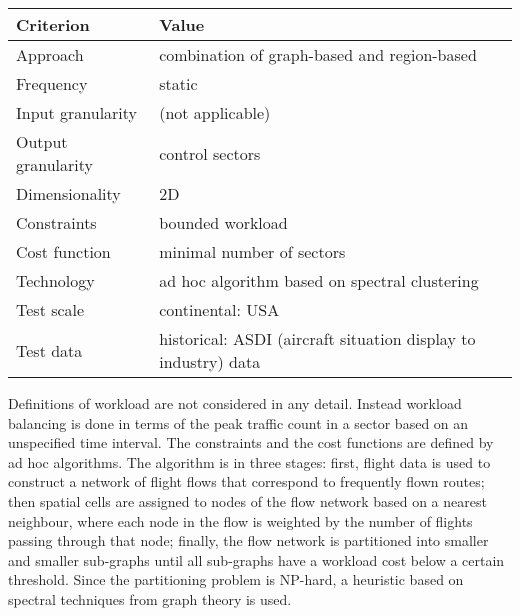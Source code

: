 \documentclass[a4paper,12pt]{article}
\begin{document}
\begin{center}
\begin{tabular}{|l|l|}
  \hline
  Criterion & Value \\
  \hline\hline
  Approach & combination of graph-based and region-based \\ \hline
  Frequency & static \\ \hline
  Input granularity & (not applicable) \\ \hline
  Output granularity & control sectors \\ \hline
  Dimensionality & 2D \\ \hline
  Constraints & bounded workload \\ \hline
  Cost function & minimal number of sectors \\ \hline
  Technology & ad hoc algorithm based on spectral clustering \\ \hline
  Test scale & continental: USA \\ \hline
  Test data & historical: ASDI (aircraft situation display to industry) data \\ \hline
\end{tabular}
\end{center}
Definitions of workload are not considered in any detail.  Instead
workload balancing is done in terms of the peak traffic count in a
sector based on an unspecified time interval.  The constraints and the
cost functions are defined by ad hoc algorithms.  The algorithm is in
three stages: first, flight data is used to construct a network of
flight flows that correspond to frequently flown routes; then spatial
cells are assigned to nodes of the flow network based on a nearest
neighbour, where each node in the flow is weighted by the number of
flights passing through that node; finally, the flow network is
partitioned into smaller and smaller sub-graphs until all sub-graphs
have a workload cost below a certain threshold.  Since the
partitioning problem is NP-hard, a heuristic based on spectral
techniques \cite{simon1991partitioning} from graph theory is used.

\subsection{\cite{Brinton:ATIO09}}
\end{document}
